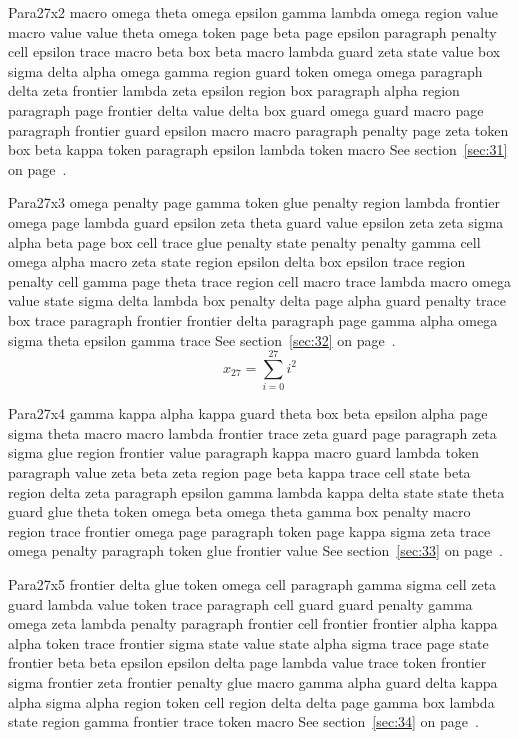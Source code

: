 \documentclass{article}
\begin{document}
Para27x2 macro omega theta omega epsilon gamma lambda omega region value macro value value theta omega token page beta page epsilon paragraph penalty cell epsilon trace macro beta box beta macro lambda guard zeta state value box sigma delta alpha omega gamma region guard token omega omega paragraph delta zeta frontier lambda zeta epsilon region box paragraph alpha region paragraph page frontier delta value delta box guard omega guard macro page paragraph frontier guard epsilon macro macro paragraph penalty page zeta token box beta kappa token paragraph epsilon lambda token macro See section~\ref{sec:31} on page~\pageref{sec:3}.

Para27x3 omega penalty page gamma token glue penalty region lambda frontier omega page lambda guard epsilon zeta theta guard value epsilon zeta zeta sigma alpha beta page box cell trace glue penalty state penalty penalty gamma cell omega alpha macro zeta state region epsilon delta box epsilon trace region penalty cell gamma page theta trace region cell macro trace lambda macro omega value state sigma delta lambda box penalty delta page alpha guard penalty trace box trace paragraph frontier frontier delta paragraph page gamma alpha omega sigma theta epsilon gamma trace See section~\ref{sec:32} on page~\pageref{sec:4}.
\begin{equation} x_{27} = \sum_{i=0}^{27} i^2 \label{eq:27}\end{equation}

Para27x4 gamma kappa alpha kappa guard theta box beta epsilon alpha page sigma theta macro macro lambda frontier trace zeta guard page paragraph zeta sigma glue region frontier value paragraph kappa macro guard lambda token paragraph value zeta beta zeta region page beta kappa trace cell state beta region delta zeta paragraph epsilon gamma lambda kappa delta state state theta guard glue theta token omega beta omega theta gamma box penalty macro region trace frontier omega page paragraph token page kappa sigma zeta trace omega penalty paragraph token glue frontier value See section~\ref{sec:33} on page~\pageref{sec:5}.

Para27x5 frontier delta glue token omega cell paragraph gamma sigma cell zeta guard lambda value token trace paragraph cell guard guard penalty gamma omega zeta lambda penalty paragraph frontier cell frontier frontier alpha kappa alpha token trace frontier sigma state value state alpha sigma trace page state frontier beta beta epsilon epsilon delta page lambda value trace token frontier sigma frontier zeta frontier penalty glue macro gamma alpha guard delta kappa alpha sigma alpha region token cell region delta delta page gamma box lambda state region gamma frontier trace token macro See section~\ref{sec:34} on page~\pageref{sec:6}.
\end{document}
